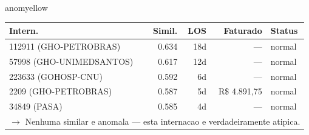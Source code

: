 \documentclass[a4paper,10pt]{article}
\begin{document}
\begin{anomalycard}[Internacao 179 | GHO-COPEL | MODERADO (z=2.02)]{anomyellow}
\begin{tabular}{l r r r l}\toprule\textbf{Intern.} & \textbf{Simil.} & \textbf{LOS} & \textbf{Faturado} & \textbf{Status} \\\midrule
112911 (GHO-PETROBRAS) & 0.634 & 18d & --- & \textcolor{jcubeblue}{normal} \\
57998 (GHO-UNIMEDSANTOS) & 0.617 & 12d & --- & \textcolor{jcubeblue}{normal} \\
223633 (GOHOSP-CNU) & 0.592 & 6d & --- & \textcolor{jcubeblue}{normal} \\
2209 (GHO-PETROBRAS) & 0.587 & 5d & R\$ 4.891,75 & \textcolor{jcubeblue}{normal} \\
34849 (PASA) & 0.585 & 4d & --- & \textcolor{jcubeblue}{normal} \\
\multicolumn{5}{l}{\textcolor{jcubeblue}{\small $\rightarrow$ Nenhuma similar e anomala --- esta internacao e verdadeiramente atipica.}} \\
\bottomrule\end{tabular}



\end{anomalycard}
\end{document}
